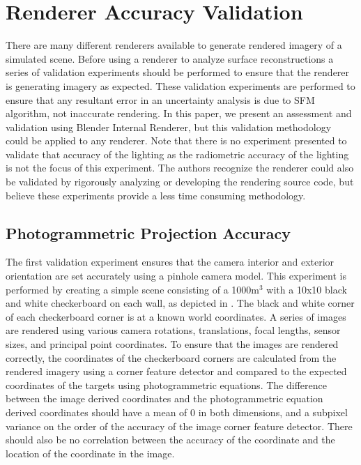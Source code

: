 \section{Renderer Accuracy Validation}

There are many different renderers available to generate rendered imagery of a simulated scene.  Before using a renderer to analyze surface reconstructions a series of validation experiments should be performed to ensure that the renderer is generating imagery as expected.  These validation experiments are performed to ensure that any resultant error in an uncertainty analysis is due to SFM algorithm, not inaccurate rendering.  In this paper, we present an assessment and validation using Blender Internal Renderer, but this validation methodology could be applied to any renderer.  Note that there is no experiment presented to validate that accuracy of the lighting as the radiometric accuracy of the lighting is not the focus of this experiment.  The authors recognize the renderer could also be validated by rigorously analyzing or developing the rendering source code, but believe these experiments provide a less time consuming methodology.

\subsection{Photogrammetric Projection Accuracy}
The first validation experiment ensures that the camera interior and exterior orientation are set accurately using a pinhole camera model.  This experiment is performed by creating a simple scene consisting of a 1000m$^3$ with a 10x10 black and white checkerboard on each wall, as depicted in .   The black and white corner of each checkerboard corner is at a known world coordinates.  A series of images are rendered using various camera rotations, translations, focal lengths, sensor sizes, and principal point coordinates.  To ensure that the images are rendered correctly, the coordinates of the checkerboard corners are calculated from the rendered imagery using a corner feature detector and compared to the expected coordinates of the targets using photogrammetric equations.  The difference between the image derived coordinates and the photogrammetric equation derived coordinates should have a mean of 0 in both dimensions, and a subpixel variance on the order of the accuracy of the image corner feature detector.  There should also be no correlation between the accuracy of the coordinate and the location of the coordinate in the image.

